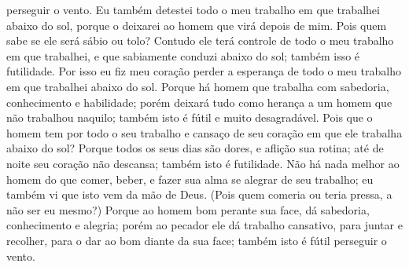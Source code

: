 {{} perseguir o vento.
  Eu também detestei todo o meu trabalho em que trabalhei abaixo do sol, porque o deixarei ao homem que virá depois de mim.
  Pois quem sabe se ele será sábio ou tolo? Contudo ele terá controle de todo o meu trabalho em que trabalhei, e que sabiamente conduzi abaixo do sol; também isso é futilidade.
  Por isso eu fiz meu coração perder a esperança de todo o meu trabalho em que trabalhei abaixo do sol.
  Porque há
{} homem que trabalha com sabedoria, conhecimento e habilidade; porém deixará tudo como herança a um
{} homem que não trabalhou naquilo; também isto é fútil e muito desagradável.
  Pois que
{} o homem tem por todo o seu trabalho e cansaço de seu coração em que ele trabalha abaixo do sol?
  Porque todos os seus dias são dores, e aflição
{} sua rotina; até de noite seu coração não descansa; também isto é futilidade.
  Não há nada melhor ao homem do que comer, beber, e fazer sua alma se alegrar de seu trabalho; eu também vi que isto vem da mão de Deus.
  (Pois quem
{} comeria ou teria pressa, a não ser eu mesmo?)
  Porque ao homem bom perante sua face,
{} dá sabedoria, conhecimento e alegria; porém ao pecador ele dá trabalho cansativo, para juntar e recolher, para o dar ao bom diante da sua face; também isto é fútil
{} perseguir o vento.
\par }

